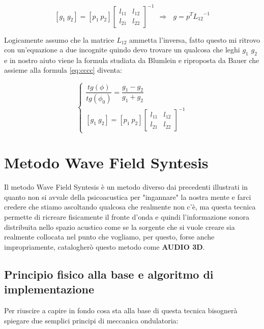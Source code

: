 \documentclass[12pt,a4paper]{report}
\begin{document}
\begin{equation}
\left[g_1 \ g_2\right] = \left[ p_1 \ p_2 \right]  {\left[\begin{matrix} 
l_{11} & l_{12}\\ l_{21} & l_{22}
\end{matrix} \right]}^{-1} \ \ \Rightarrow \ \ \ g=p^T {L_{12}}^{-1}
\label{eq:dddd}
\end{equation}

Logicamente assumo che la matrice $L_{12}$ ammetta l'inversa, fatto questo mi ritrovo con un'equazione a due incognite quindo devo trovare un qualcosa che leghi $g_1$ $g_2$ e in nostro aiuto viene la formula studiata da Blumlein e riproposta da Bauer che assieme alla formula \ref{eq:cccc} diventa:

\begin{equation}
\left\{ \begin{matrix}
\dfrac{tg (\phi)}{tg(\phi_0)}= \dfrac{g_1 - g_2}{g_1 + g_2} \\
\left[ g_1 \ g_2\right] = \left[ p_1 \ p_2 \right]  {\left[ \begin{matrix} 
l_{11} & l_{12}\\ l_{21} & l_{22}
\end{matrix} \right]}^{-1}
\end{matrix}\right.
\label{eq:eeee}
\end{equation}


\chapter{Metodo Wave Field Syntesis}

Il metodo Wave Field Syntesis è un metodo diverso dai precedenti illustrati in quanto non si avvale della psicoacustica per "ingannare" la nostra mente e farci credere che stiamo ascoltando qualcosa che realmente non c'è, ma questa tecnica permette di ricreare fisicamente il fronte d'onda e quindi l'informazione sonora distribuita nello spazio acustico come se la sorgente che si vuole creare sia realmente collocata nel punto che vogliamo, per questo, forse anche impropriamente, catalogherò questo metodo come \textbf{AUDIO 3D}.\\

\section{Principio fisico alla base e algoritmo di implementazione}

Per riuscire a capire in fondo cosa sta alla base di questa tecnica bisognerà spiegare due semplici principi di meccanica ondulatoria: 
\end{document}
